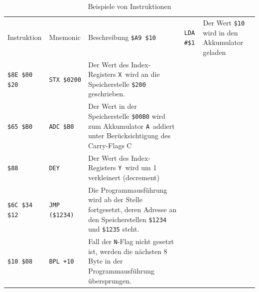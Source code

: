 \documentclass[11pt]{scrartcl}
\newcommand{\xreg}{\texttt{X}}
\newcommand{\yreg}{\texttt{Y}}
\newcommand{\acc}{\texttt{A}}
\newcommand{\nflag}{\texttt{N}}
\newcommand{\hex}[1]{\texttt{\$#1}}
\begin{document}
\begin{longtable}{@{}llp{10cm}@{}}
  \caption{Beispiele von Instruktionen}
  \label{tab:instruction_examples} \\
    \toprule
    Instruktion &  Mnemonic & Beschreibung \endhead
    \midrule
    \lstinline!$A9 $10! & \lstinline!LDA #$1!   & Der Wert \hex{10}
                                                  wird in den
                                                  Akkumulator geladen\\           
    \lstinline!$8E $00 $20! & \lstinline!STX $0200! & Der Wert des
                                                      Index-Registers
                                                      \xreg\ wird an die
                                                      Speicherstelle
                                                      \hex{200}
                                                      geschrieben. \\
    \lstinline!$65 $B0! & \lstinline!ADC $B0! & Der Wert in der
                                                Speicherstelle
                                                \hex{00B0} wird zum
                                                Akkumulator \acc\ addiert
                                                unter Berücksichtigung
                                                des Carry-Flags C \\
    \lstinline!$88! & \lstinline!DEY! & Der Wert des Index-Registers \yreg\
                                        wird um 1 verkleinert
                                        (decrement) \\
    \lstinline!$6C $34 $12! & \lstinline!JMP ($1234)! & Die
                                                       Programmausführung
                                                       wird ab der
                                                       Stelle
                                                       fortgesetzt,
                                                       deren Adresse an
                                                       den Speicherstellen
                                                       \hex{1234} und
                                                       \hex{1235}
                                                        steht. \\
    \lstinline!$10 $08! & \lstinline!BPL +10! & Fall der \nflag-Flag nicht
                                                gesetzt ist, werden die nächsten
                                                8 Byte in der
                                                Programmausführung
                                                übersprungen.


\end{longtable}
\end{document}
